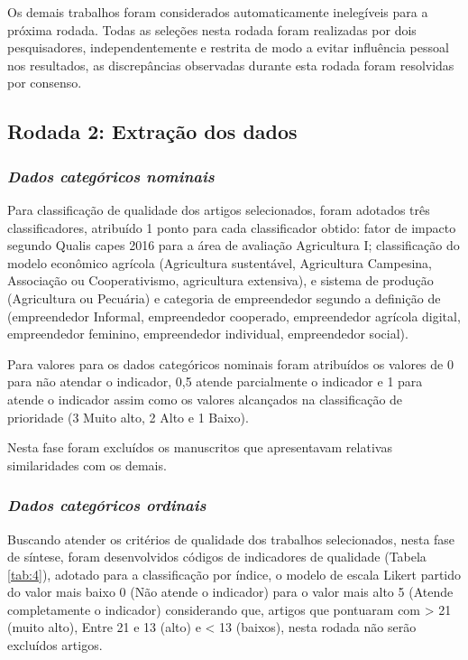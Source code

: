 Os demais trabalhos foram considerados automaticamente inelegíveis para a próxima rodada. Todas as seleções nesta rodada foram realizadas por dois pesquisadores, independentemente e restrita de modo a evitar influência pessoal nos resultados, as discrepâncias observadas durante esta rodada foram resolvidas por consenso.

\subsection{Rodada 2: Extração dos dados}

\subsubsection*{\textit{Dados categóricos nominais}}
 Para classificação de qualidade dos artigos selecionados, foram adotados três classificadores, atribuído 1 ponto para cada classificador obtido: fator de impacto segundo Qualis capes 2016 para a área de avaliação Agricultura I; classificação do modelo econômico agrícola (Agricultura sustentável, Agricultura Campesina, Associação ou Cooperativismo, agricultura extensiva), e sistema de produção (Agricultura ou Pecuária) e categoria de empreendedor segundo a definição de  (empreendedor Informal, empreendedor cooperado, empreendedor agrícola digital, empreendedor feminino, empreendedor individual, empreendedor social).

Para valores para os dados categóricos nominais foram atribuídos os valores de 0 para não atendar o indicador, 0,5 atende parcialmente o indicador e 1 para atende o indicador assim como os valores alcançados na classificação de prioridade (3 Muito alto, 2 Alto e 1 Baixo).

Nesta fase foram excluídos os manuscritos que apresentavam relativas similaridades com os demais.

\subsubsection*{\textit{Dados categóricos ordinais}}

Buscando atender os critérios de qualidade dos trabalhos selecionados, nesta fase de síntese, foram desenvolvidos códigos de indicadores de qualidade (Tabela \ref{tab:4}), adotado para a classificação por índice, o modelo de escala Likert partido do valor mais baixo 0 (Não atende o indicador) para o valor mais alto 5 (Atende completamente o indicador) considerando que, artigos que pontuaram com > 21 (muito alto), Entre 21 e 13 (alto) e < 13 (baixos), nesta rodada não serão excluídos artigos.

